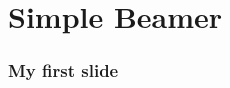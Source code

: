 \documentclass{beamer}
\begin{document}
\begin{frame}
    \titlepage
\end{frame}

\section{Simple Beamer}
\begin{frame}
    \frametitle{My first slide}
\end{frame}\

\end{document}
